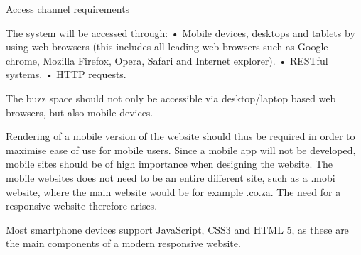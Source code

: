 Access channel requirements

The system will be accessed through:
•	Mobile devices, desktops and tablets by using web browsers (this includes all leading web browsers such as Google chrome, Mozilla Firefox, Opera, Safari and Internet explorer).
•	RESTful systems.
•	HTTP requests.

The buzz space should not only be accessible via desktop/laptop based web browsers, but also mobile devices.

Rendering of a mobile version of the website should thus be required in order to maximise ease of use for mobile users. Since a mobile app will not be developed, mobile sites should be of high importance when designing the website. The mobile websites does not need to be an entire different site, such as a .mobi website, where the main website would be for example .co.za. The need for a responsive website therefore arises.

Most smartphone devices support JavaScript, CSS3 and HTML 5, as these are the main components of a modern responsive website.
